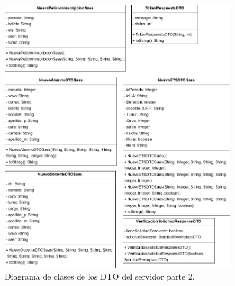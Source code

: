 \begin{figure}[htbp!]
	\begin{center}
		\includegraphics[width=0.9\textwidth]{Clases/DTO2.png}
		\caption{Diagrama de clases de los DTO del servidor parte 2.}
		\label{fig:DTO2}
	\end{center}
\end{figure}

